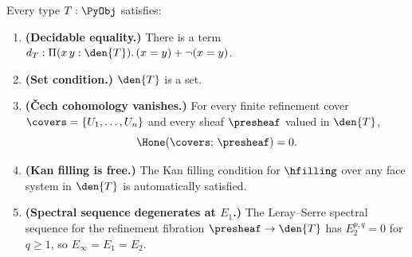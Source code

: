 \begin{theorem}
\label{thm:hedberg-collapse}
Every type $T : \PyObj$ satisfies:
\begin{enumerate}
\item \textbf{(Decidable equality.)} There is a term
  $d_T : \Pi(x\, y : \den{T}).\, (x = y) + \neg(x = y)$.
\item \textbf{(Set condition.)} $\den{T}$ is a set.
\item \textbf{(\v{C}ech cohomology vanishes.)} For every finite
  refinement cover $\covers = \{U_1, \ldots, U_n\}$ and every
  sheaf $\presheaf$ valued in $\den{T}$,
  \[
    \Hone(\covers;\, \presheaf) = 0.
  \]
\item \textbf{(Kan filling is free.)} The Kan filling condition for
  $\hfilling$ over any face system in $\den{T}$ is automatically
  satisfied.
\item \textbf{(Spectral sequence degenerates at $E_1$.)} The
  Leray--Serre spectral sequence for the refinement fibration
  $\presheaf \to \den{T}$ has $E_2^{p,q} = 0$ for $q \geq 1$,
  so $E_\infty = E_1 = E_2$.
\end{enumerate}
\end{theorem}

